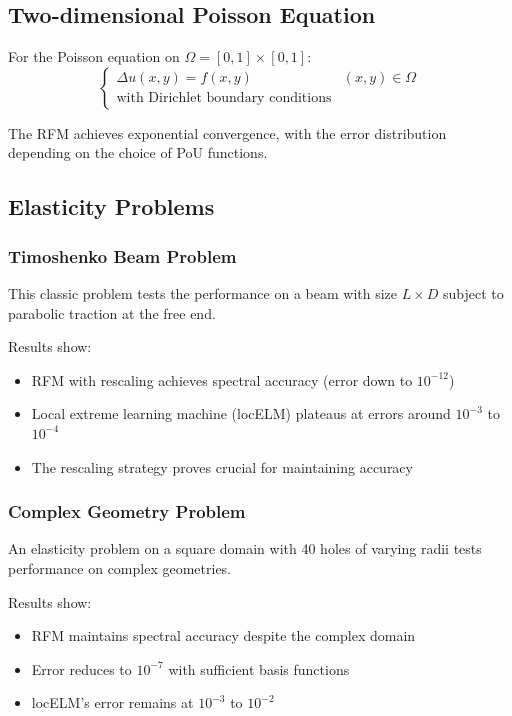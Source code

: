 \documentclass[11pt]{article}
\begin{document}
\subsection{Two-dimensional Poisson Equation}
For the Poisson equation on $\Omega = [0,1] \times [0,1]$:
\begin{equation}
\begin{cases}
\Delta u(x,y) = f(x,y) & (x,y) \in \Omega \\
\text{with Dirichlet boundary conditions}
\end{cases}
\end{equation}

The RFM achieves exponential convergence, with the error distribution depending on the choice of PoU functions.

\subsection{Elasticity Problems}
\subsubsection{Timoshenko Beam Problem}
This classic problem tests the performance on a beam with size $L \times D$ subject to parabolic traction at the free end.

Results show:
\begin{itemize}
    \item RFM with rescaling achieves spectral accuracy (error down to $10^{-12}$)
    \item Local extreme learning machine (locELM) plateaus at errors around $10^{-3}$ to $10^{-4}$
    \item The rescaling strategy proves crucial for maintaining accuracy
\end{itemize}

\subsubsection{Complex Geometry Problem}
An elasticity problem on a square domain with 40 holes of varying radii tests performance on complex geometries.

Results show:
\begin{itemize}
    \item RFM maintains spectral accuracy despite the complex domain
    \item Error reduces to $10^{-7}$ with sufficient basis functions
    \item locELM's error remains at $10^{-3}$ to $10^{-2}$
\end{itemize}
\end{document}
